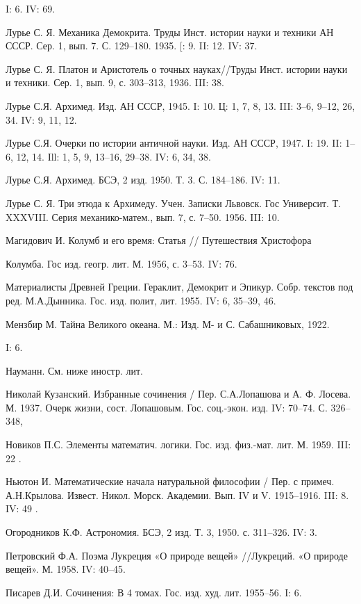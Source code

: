 I: 6. IV: 69.

Лурье С. Я. Механика Демокрита. Труды Инст. истории науки и техники АН
СССР. Сер. 1, вып. 7. С. 129--180. 1935. [: 9. II: 12. IV: 37.

Лурье С. Я.  Платон и Аристотель о точных  науках//Труды Инст. истории
науки и техники. Сер. 1, вып. 9, с. 303--313, 1936. III: 38.

Лурье С.Я. Архимед.  Изд. АН СССР, 1945.  I: 10. Ц: 1, 7,  8, 13. III:
3--6, 9--12, 26, 34. IV: 9, 11, 12.

Лурье С.Я.  Очерки по истории античной  науки. Изд. АН СССР,  1947. I:
19. II: 1--6, 12, 14. Ill: 1, 5, 9, 13--16, 29--38. IV: 6, 34, 38.

Лурье С.Я. Архимед. БСЭ, 2 изд. 1950. Т. 3. С. 184--186. IV: 11.

Лурье  С.  Я.  Три  этюда  к  Архимеду.  Учен.  Записки  Львовск.  Гос
Университ. Т. XXXVIII. Серия механико-матем.,  вып. 7, с. 7--50. 1956.
III: 10.

Магидович И. Колумб и его время: Статья // Путешествия Христофора

Колумба. Гос изд. геогр. лит. М. 1956, с. 3--53. IV: 76.

Материалисты  Древней  Греции.  Гераклит,  Демокрит  и  Эпикур.  Собр.
текстов  под ред.  М.А.Дынника. Гос.  изд.  полит, лит.  1955. IV:  6,
35--39, 46.

Мензбир М. Тайна Великого океана. М.: Изд. М- и С. Сабашниковых, 1922.

I: 6.

Науманн. См. ниже иностр. лит.

Николай Кузанский.  Избранные сочинения  / Пер.  С.А.Лопашова и  А. Ф.
Лосева. М.  1937. Очерк жизни,  сост. Лопашовым. Гос.  соц.-экон. изд.
IV: 70--74. С. 326--348,

Новиков П.С. Элементы  математич. логики. Гос. изд.  физ.-мат. лит. М.
1959. III: 22                                                        .

Ньютон И. Математические начала натуральной философии / Пер. с примеч.
А.Н.Крылова. Извест. Никол. Морск. Академии.  Вып. IV и V. 1915--1916.
III: 8. IV: 49                                                       .

Огородников К.Ф. Астрономия. БСЭ, 2 изд.  Т. 3, 1950. с. 311--326. IV:
3.

Петровский  Ф.А.  Поэма  Лукреция  «О природе  вещей»  //Лукреций.  «О
природе вещей». М. 1958. IV: 40--45.

Писарев Д.И. Сочинения: В 4 томах. Гос. изд. худ. лит. 1955--56. I: 6.

